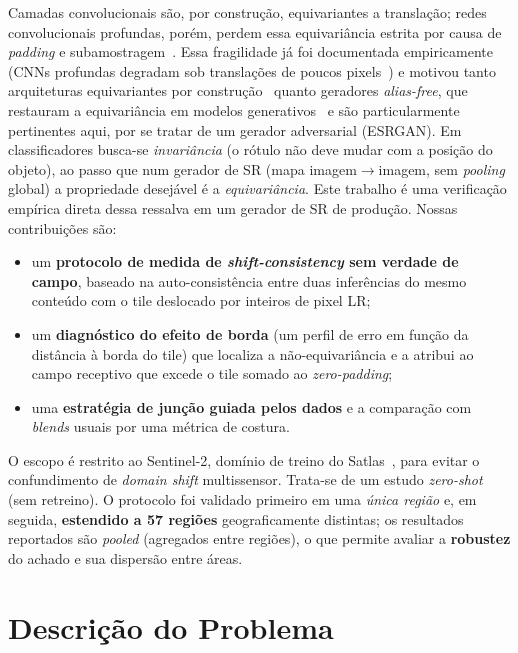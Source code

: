 \documentclass[conference]{IEEEtran}
\begin{document}
Camadas convolucionais são, por construção, equivariantes a translação; redes
convolucionais profundas, porém, perdem essa equivariância estrita por causa de
\textit{padding} e subamostragem~\cite{b_shiftinv}. Essa fragilidade já foi documentada
empiricamente (CNNs profundas degradam sob translações de poucos
pixels~\cite{b_azulay}) e motivou tanto arquiteturas equivariantes por
construção~\cite{b_gconv} quanto geradores \emph{alias-free}, que restauram a
equivariância em modelos generativos~\cite{b_aliasfree} e são particularmente
pertinentes aqui, por se tratar de um gerador adversarial (ESRGAN). Em classificadores
busca-se \emph{invariância} (o rótulo não deve mudar com a posição do objeto), ao passo
que num gerador de SR (mapa imagem$\to$imagem, sem \textit{pooling} global) a
propriedade desejável é a \emph{equivariância}. Este trabalho é uma verificação empírica
direta dessa ressalva em um gerador de SR de produção. Nossas contribuições são:
\begin{itemize}
  \item um \textbf{protocolo de medida de \textit{shift-consistency} sem verdade de
  campo}, baseado na auto-consistência entre duas inferências do mesmo conteúdo com o
  tile deslocado por inteiros de pixel LR;
  \item um \textbf{diagnóstico do efeito de borda} (um perfil de erro em função da
  distância à borda do tile) que localiza a não-equivariância e a atribui ao campo
  receptivo que excede o tile somado ao \textit{zero-padding};
  \item uma \textbf{estratégia de junção guiada pelos dados} e a comparação com
  \textit{blends} usuais por uma métrica de costura.
\end{itemize}

O escopo é restrito ao Sentinel-2, domínio de treino do Satlas~\cite{b_satlas}, para
evitar o confundimento de \textit{domain shift} multissensor. Trata-se de um estudo
\emph{zero-shot} (sem retreino). O protocolo foi validado primeiro em uma \emph{única
região} e, em seguida, \textbf{estendido a 57 regiões} geograficamente distintas; os
resultados reportados são \emph{pooled} (agregados entre regiões), o que permite avaliar
a \textbf{robustez} do achado e sua dispersão entre áreas.

\section{Descrição do Problema}
\end{document}
